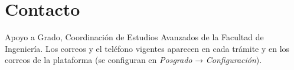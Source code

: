 \section{Contacto}
Apoyo a Grado, Coordinación de Estudios Avanzados de la Facultad de Ingeniería. Los correos y el teléfono vigentes aparecen en cada trámite y en los correos de la plataforma (se configuran en \emph{Posgrado} → \emph{Configuración}).

